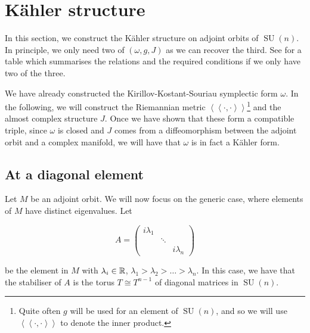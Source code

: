 \documentclass{article}
\DeclareMathOperator{\SU}{SU}
\newcommand{\iinner}[1]{\left\langle\!\left\langle #1 \right\rangle\!\right\rangle}
\begin{document}


\section{K\"ahler structure}

In this section, we construct the K\"ahler structure on adjoint orbits of \(\SU(n)\). In principle, we only need two of \((\omega, g, J)\) as we can recover the third. See  \cite[\S 13.2]{cannas_da_silva} for a table which summarises the relations and the required conditions if we only have two of the three.

We have already constructed the Kirillov-Kostant-Souriau symplectic form \(\omega\). In the following, we will construct the Riemannian metric \(\iinner{\cdot, \cdot}\)\footnote{Quite often \(g\) will be used for an element of \(\SU(n)\), and so we will use \(\iinner{\cdot, \cdot}\) to denote the inner product.} and the almost complex structure \(J\). Once we have shown that these form a compatible triple, since \(\omega\) is closed and \(J\) comes from a diffeomorphism between the adjoint orbit and a complex manifold, we will have that \(\omega\) is in fact a K\"ahler form.

\subsection{At a diagonal element}

Let \(M\) be an adjoint orbit. We will now focus on the generic case, where elements of \(M\) have distinct eigenvalues. Let

\[A = \begin{pmatrix}
    i\lambda_1 \\
    & \ddots \\
    & & i\lambda_n
\end{pmatrix}\]

be the element in \(M\) with \(\lambda_i \in \mathbb{R}\), \(\lambda_1 > \lambda_2 > \dots > \lambda_n\). In this case, we have that the stabiliser of \(A\) is the torus \(T \cong T^{n-1}\) of diagonal matrices in \(\SU(n)\).
\end{document}

